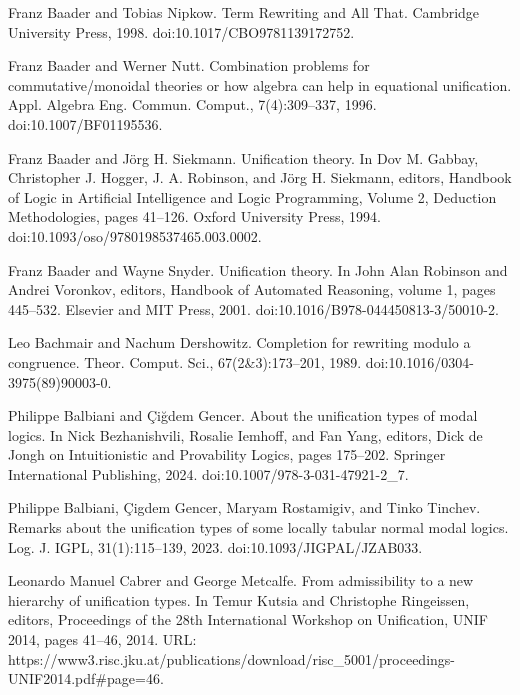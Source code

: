 \par\noindent  [16]  Franz Baader and Tobias Nipkow.  Term Rewriting and All That.  Cambridge University Press, 1998.  doi:10.1017/CBO9781139172752.  
 
\par\noindent  [17]  Franz Baader and Werner Nutt.  Combination problems for commutative/monoidal theories or how algebra can help in equational unification.  Appl. Algebra Eng. Commun. Comput., 7(4):309–337, 1996.  doi:10.1007/BF01195536.  
 
\par\noindent  [18]  Franz Baader and Jörg H. Siekmann.  Unification theory.  In Dov M. Gabbay, Christopher J. Hogger, J. A. Robinson, and Jörg H. Siekmann, editors, Handbook of Logic in Artificial Intelligence and Logic Programming, Volume 2, Deduction Methodologies, pages 41–126. Oxford University Press, 1994.  doi:10.1093/oso/9780198537465.003.0002.  
 
\par\noindent  [19]  Franz Baader and Wayne Snyder.  Unification theory.  In John Alan Robinson and Andrei Voronkov, editors, Handbook of Automated Reasoning, volume 1, pages 445–532. Elsevier and MIT Press, 2001.  doi:10.1016/B978-044450813-3/50010-2.  
 
\par\noindent  [20]  Leo Bachmair and Nachum Dershowitz.  Completion for rewriting modulo a congruence.  Theor. Comput. Sci., 67(2\&3):173–201, 1989.  doi:10.1016/0304-3975(89)90003-0.  
 
\par\noindent  [21]  Philippe Balbiani and Çiğdem Gencer.  About the unification types of modal logics.  In Nick Bezhanishvili, Rosalie Iemhoff, and Fan Yang, editors, Dick de Jongh on Intuitionistic and Provability Logics, pages 175–202. Springer International Publishing, 2024.  doi:10.1007/978-3-031-47921-2\_7.  
 
\par\noindent  [22]  Philippe Balbiani, Çigdem Gencer, Maryam Rostamigiv, and Tinko Tinchev.  Remarks about the unification types of some locally tabular normal modal logics.  Log. J. IGPL, 31(1):115–139, 2023.  doi:10.1093/JIGPAL/JZAB033.  
 
\par\noindent  [23]  Leonardo Manuel Cabrer and George Metcalfe.  From admissibility to a new hierarchy of unification types.  In Temur Kutsia and Christophe Ringeissen, editors, Proceedings of the 28th International Workshop on Unification, UNIF 2014, pages 41–46, 2014.  URL: https://www3.risc.jku.at/publications/download/risc\_5001/proceedings-UNIF2014.pdf\#page=46.  
 
